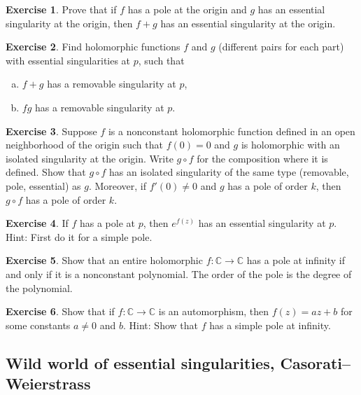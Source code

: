 \documentclass[12pt,openany]{book}
\newcommand{\C}{{\mathbb{C}}}
\theoremstyle{plain}
\theoremstyle{remark}
\theoremstyle{definition}
\newenvironment{exbox}{%
    \def\FrameCommand{\vrule width 1pt \relax\hspace{10pt}}%
    \MakeFramed{\advance\hsize-\width\FrameRestore}%
}{%
    \endMakeFramed
}
\newenvironment{exparts}{%
    \leavevmode\begin{enumerate}[a),noitemsep,topsep=0pt,parsep=0pt,partopsep=0pt]
}{%
    \end{enumerate}
}
\theoremstyle{exercise}
\newtheorem{exercise}{Exercise}[section]
\theoremstyle{example}
\begin{document}
\begin{exbox}
\begin{exercise}
Prove that if $f$ has a pole at the origin and $g$ has an essential
singularity at the origin, then $f+g$ has an essential singularity at the
origin.
\end{exercise}

\begin{exercise}
Find holomorphic functions $f$ and $g$ (different pairs for each part) with
essential singularities at $p$, such that
\begin{exparts}
\item
$f+g$ has a removable singularity at $p$,
\item
$fg$ has a removable singularity at $p$.
\end{exparts}
\end{exercise}

\begin{exercise}
Suppose $f$ is a nonconstant holomorphic function defined in an open neighborhood of the
origin such that $f(0)=0$ and $g$ is holomorphic with
an isolated singularity at the origin.  Write $g \circ f$ for the
composition where it is defined.  Show that $g \circ f$ has an isolated
singularity of the same type (removable, pole, essential) as $g$.
Moreover, if $f'(0) \not= 0$ and $g$ has a pole of order $k$, then $g \circ f$ has a
pole of order $k$.
\end{exercise}

\begin{exercise} \label{exercise:expofpole}
If $f$ has a pole at $p$, then $e^{f(z)}$ has an essential singularity at
$p$.  Hint: First do it for a simple pole.
\end{exercise}

\begin{exercise}
Show that an entire holomorphic $f \colon \C \to \C$ has a pole at infinity
if and only if it is a nonconstant polynomial.
The order of the pole is the degree of the polynomial.
\end{exercise}

\begin{exercise}
Show that if $f \colon \C \to \C$ is an automorphism, then
$f(z) = az + b$ for
some constants $a \not= 0$ and $b$.  Hint: Show that $f$ has a simple pole at
infinity.
\end{exercise}
\end{exbox}

\subsection{Wild world of essential singularities, Casorati--Weierstrass}
\end{document}
